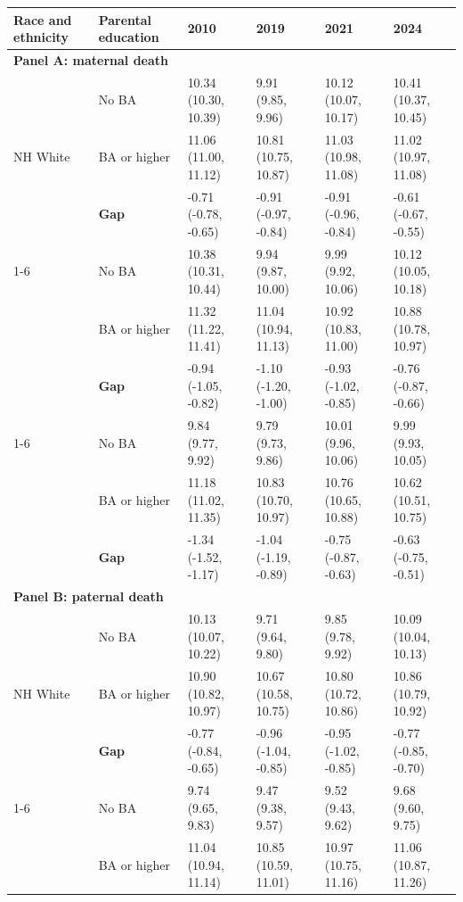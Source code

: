 \begin{threeparttable}
\begin{tabular}{llllll}
\toprule
Race and ethnicity & Parental education & 2010 & 2019 & 2021 & 2024 \\
\midrule
\multicolumn{6}{l}{\textbf{Panel A: maternal death}} \\
\multirow{3}{*}{NH White} & No BA & 10.34 (10.30, 10.39) & 9.91 (9.85, 9.96) & 10.12 (10.07, 10.17) & 10.41 (10.37, 10.45) \\
 & BA or higher & 11.06 (11.00, 11.12) & 10.81 (10.75, 10.87) & 11.03 (10.98, 11.08) & 11.02 (10.97, 11.08) \\
 & \textbf{Gap} & -0.71 (-0.78, -0.65) & -0.91 (-0.97, -0.84) & -0.91 (-0.96, -0.84) & -0.61 (-0.67, -0.55) \\
\cmidrule(lr){1-6}
\multirow{3}{*}{NH Black} & No BA & 10.38 (10.31, 10.44) & 9.94 (9.87, 10.00) & 9.99 (9.92, 10.06) & 10.12 (10.05, 10.18) \\
 & BA or higher & 11.32 (11.22, 11.41) & 11.04 (10.94, 11.13) & 10.92 (10.83, 11.00) & 10.88 (10.78, 10.97) \\
 & \textbf{Gap} & -0.94 (-1.05, -0.82) & -1.10 (-1.20, -1.00) & -0.93 (-1.02, -0.85) & -0.76 (-0.87, -0.66) \\
\cmidrule(lr){1-6}
\multirow{3}{*}{Hispanic} & No BA & 9.84 (9.77, 9.92) & 9.79 (9.73, 9.86) & 10.01 (9.96, 10.06) & 9.99 (9.93, 10.05) \\
 & BA or higher & 11.18 (11.02, 11.35) & 10.83 (10.70, 10.97) & 10.76 (10.65, 10.88) & 10.62 (10.51, 10.75) \\
 & \textbf{Gap} & -1.34 (-1.52, -1.17) & -1.04 (-1.19, -0.89) & -0.75 (-0.87, -0.63) & -0.63 (-0.75, -0.51) \\
\midrule
\multicolumn{6}{l}{\textbf{Panel B: paternal death}} \\
\multirow{3}{*}{NH White} & No BA & 10.13 (10.07, 10.22) & 9.71 (9.64, 9.80) & 9.85 (9.78, 9.92) & 10.09 (10.04, 10.13) \\
 & BA or higher & 10.90 (10.82, 10.97) & 10.67 (10.58, 10.75) & 10.80 (10.72, 10.86) & 10.86 (10.79, 10.92) \\
 & \textbf{Gap} & -0.77 (-0.84, -0.65) & -0.96 (-1.04, -0.85) & -0.95 (-1.02, -0.85) & -0.77 (-0.85, -0.70) \\
\cmidrule(lr){1-6}
\multirow{3}{*}{NH Black} & No BA & 9.74 (9.65, 9.83) & 9.47 (9.38, 9.57) & 9.52 (9.43, 9.62) & 9.68 (9.60, 9.75) \\
 & BA or higher & 11.04 (10.94, 11.14) & 10.85 (10.59, 11.01) & 10.97 (10.75, 11.16) & 11.06 (10.87, 11.26) \\

\end{tabular}
\end{threeparttable}
